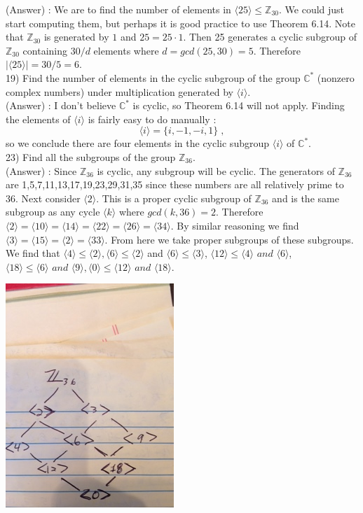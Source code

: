\documentclass[12pt, letterpaper]{article}
\begin{document}
(Answer) : We are to find the number of elements in $\langle 25 \rangle \leq \mathbb{Z}_30$. We could just start computing them, but perhaps it is good practice to use Theorem 6.14. Note that $\mathbb{Z}_30$ is generated by $1$ and $25 = 25 \cdot 1$. Then 25 generates a cyclic subgroup of $\mathbb{Z}_30$ containing $30/d$ elements where $d = gcd(25,30) = 5$. Therefore $|\langle 25 \rangle | = 30/5 = 6$. \\

19) Find the number of elements in the cyclic subgroup of the group $\mathbb{C}^*$ (nonzero complex numbers) under multiplication generated by $\langle i \rangle$. \\

(Answer) : I don't believe $\mathbb{C}^*$ is cyclic, so Theorem 6.14 will not apply. Finding the elements of $\langle i \rangle$ is fairly easy to do manually : $$ \langle i \rangle = \{i, -1, -i, 1\}\;,$$ so we conclude there are four elements in the cyclic subgroup $\langle i \rangle$ of $\mathbb{C}^*$. \\

23) Find all the subgroups of the group $\mathbb{Z}_36$. \\

(Answer) : Since $\mathbb{Z}_36$ is cyclic, any subgroup will be cyclic. The generators of $\mathbb{Z}_36$ are 1,5,7,11,13,17,19,23,29,31,35 since these numbers are all relatively prime to 36. Next consider $\langle 2 \rangle$. This is a proper cyclic subgroup of $\mathbb{Z}_36$ and is the same subgroup as any cycle $\langle k \rangle$ where $gcd(k,36) = 2$. Therefore $\langle 2 \rangle = \langle 10 \rangle = \langle 14 \rangle = \langle 22\rangle = \langle 26 \rangle = \langle 34  \rangle$. By similar reasoning we find $\langle 3\rangle = \langle 15\rangle = \langle 2\rangle = \langle 33\rangle$. From here we take proper subgroups of these subgroups. We find that $\langle 4 \rangle \leq \langle 2\rangle, \langle 6\rangle \leq \langle 2 \rangle$ and $\langle 6\rangle \leq \langle 3\rangle$, $\langle 12\rangle \leq \langle 4\rangle \textit{ and } \langle 6\rangle$, $\langle 18\rangle \leq \langle 6\rangle \textit{ and } \langle 9\rangle, \langle 0\rangle \leq \langle 12\rangle \textit{ and } \langle 18\rangle$. 

\includegraphics{IMG_2804}\\
\end{document}
